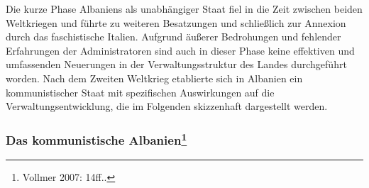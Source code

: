 Die kurze Phase Albaniens als unabhängiger Staat fiel in die Zeit zwischen beiden Weltkriegen und führte zu weiteren Besatzungen und schließlich zur Annexion durch das faschistische Italien. Aufgrund äußerer Bedrohungen und fehlender Erfahrungen der Administratoren sind auch in dieser Phase keine effektiven und umfassenden Neuerungen in der Verwaltungsstruktur des Landes durchgeführt worden. Nach dem Zweiten Weltkrieg etablierte sich in Albanien ein kommunistischer Staat mit spezifischen Auswirkungen auf die Verwaltungsentwicklung, die im Folgenden skizzenhaft dargestellt werden.
\subsubsection[Das kommunistische Albanien]{Das kommunistische Albanien\footnote{Vollmer 2007: 14ff..}}

